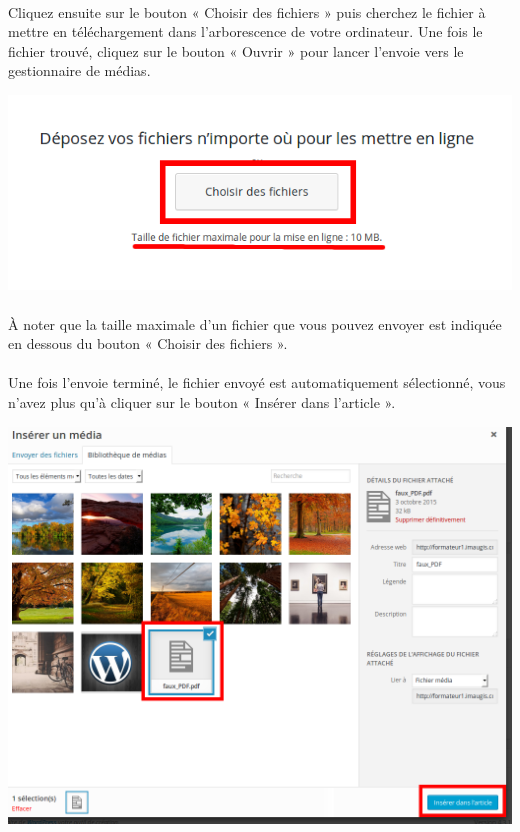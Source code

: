 \documentclass[10pt,a4paper]{article}
\begin{document}
\paragraph{}Cliquez ensuite sur le bouton « Choisir des fichiers » puis cherchez le fichier à mettre en téléchargement dans l'arborescence de votre ordinateur. Une fois le fichier trouvé, cliquez sur le bouton « Ouvrir » pour lancer l'envoie vers le gestionnaire de médias.
\begin{center}
\includegraphics[scale=0.35]{img/0084.png}
\end{center}
\paragraph{}À noter que la taille maximale d'un fichier que vous pouvez envoyer est indiquée en dessous du bouton « Choisir des fichiers ».
\paragraph{}Une fois l'envoie terminé, le fichier envoyé est automatiquement sélectionné, vous n'avez plus qu'à cliquer sur le bouton « Insérer dans l'article ».
\begin{center}
\includegraphics[scale=0.3]{img/0082.png}
\end{center}
\end{document}

